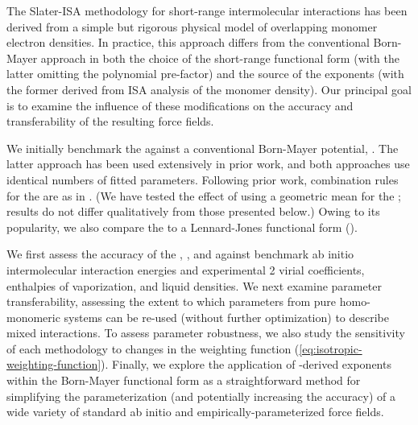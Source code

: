 
The Slater-ISA methodology for short-range intermolecular interactions has
been derived from a simple but rigorous physical model of overlapping
monomer electron densities. In practice, this approach differs from the
conventional Born-Mayer approach in both the choice of the short-range
functional form (with the latter omitting the polynomial pre-factor) and the
source of the exponents (with the former derived from ISA analysis of the
monomer density). Our principal goal is to examine the influence of these
modifications on the accuracy and transferability of the resulting force
fields.

We initially benchmark the \isaffold against a conventional Born-Mayer potential,
\saptff.
The latter approach has been used extensively in prior
work,\cite{Schmidt2015,McDaniel2013} and both approaches use identical numbers of
fitted parameters.  Following prior work, combination rules for the \saptff are as in
. (We have tested the effect of using a geometric mean
for the \saptff; results do not differ qualitatively from those presented
below.) Owing to its popularity, we also compare the \isaffold to a Lennard-Jones
functional form (\ljff).

We first assess the accuracy of the \isaffold, \saptff, and \ljff against benchmark
ab initio intermolecular interaction energies and experimental 2
virial coefficients, enthalpies of vaporization, and liquid densities. 
We next examine parameter transferability, assessing the
extent to which parameters from pure homo-monomeric systems can be re-used
(without further optimization) to describe mixed interactions. To assess 
parameter robustness, we also study the sensitivity of each methodology to
changes in the weighting function (\cref{eq:isotropic-weighting-function}). Finally, we
explore the application of \bsisa-derived exponents within the Born-Mayer
functional form as a straightforward method for simplifying the
parameterization (and potentially increasing the accuracy) of a wide variety of
standard ab initio and empirically-parameterized force fields.


